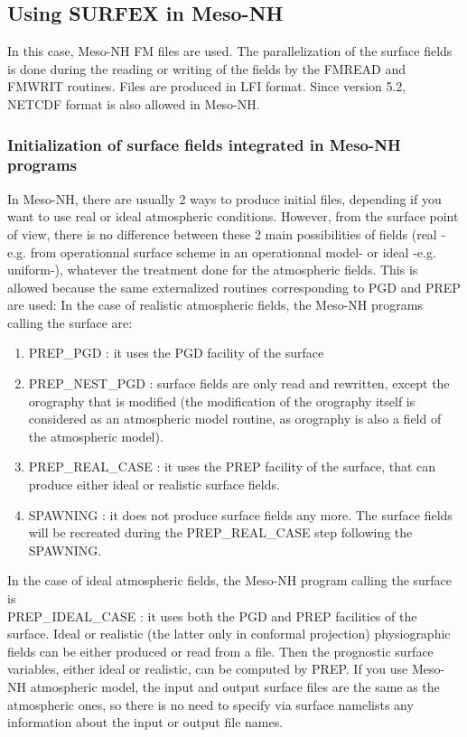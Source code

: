 \subsection{Using SURFEX in Meso-NH}
In this case, Meso-NH FM files are used. The parallelization of the surface fields is done during the
reading or writing of the fields by the FMREAD and FMWRIT routines. Files are produced in LFI
format. Since version 5.2, NETCDF format is also allowed in Meso-NH.

\subsubsection{Initialization of surface fields integrated in Meso-NH programs}
In Meso-NH, there are usually 2 ways to produce initial files, depending if you want to use real or
ideal atmospheric conditions. However, from the surface point of view, there is no difference
between these 2 main possibilities of fields (real -e.g. from operationnal surface scheme in an
operationnal model- or ideal -e.g. uniform-), whatever the treatment done for the atmospheric fields.
This is allowed because the same externalized routines corresponding to PGD and PREP are used:
In the case of realistic atmospheric fields, the Meso-NH programs calling the surface are:
\begin{enumerate}
	\item PREP\_PGD : it uses the PGD facility of the surface
	\item PREP\_NEST\_PGD : surface fields are only read and rewritten, except the orography that is
modified (the modification of the orography itself is considered as an atmospheric model
routine, as orography is also a field of the atmospheric model).
	\item PREP\_REAL\_CASE : it uses the PREP facility of the surface, that can produce either ideal
or realistic surface fields.
	\item SPAWNING : it does not produce surface fields any more. The surface fields will be
recreated during the PREP\_REAL\_CASE step following the SPAWNING.
\end{enumerate}
In the case of ideal atmospheric fields, the Meso-NH program calling the surface is \\ PREP\_IDEAL\_CASE : it uses both the PGD and PREP facilities of the surface. Ideal or realistic (the latter only in conformal projection) physiographic fields can be either produced or read from a file. Then the prognostic surface variables, either ideal or realistic, can be computed by PREP.
If you use Meso-NH atmospheric model, the input and output surface files are the same as the atmospheric ones, so there is no need to specify via surface namelists any information about the input or output file names.

